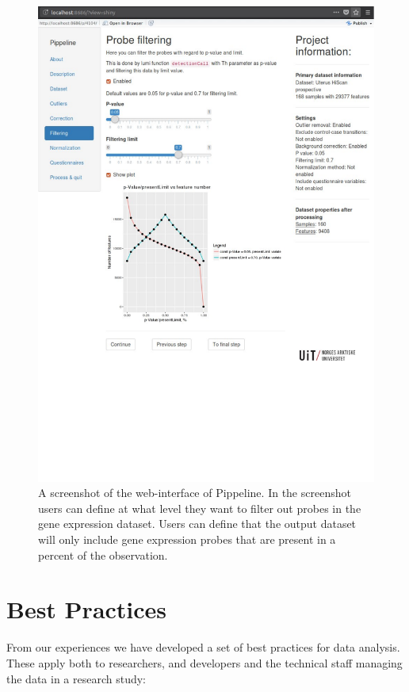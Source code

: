 \begin{figure}
    \includegraphics[width=\linewidth]{figures/scr_filtering.pdf}
    \caption[A screenshot of the web-interface of Pippeline.]{A screenshot of
    the web-interface of Pippeline. In the screenshot users can define at what
    level they want to filter out probes in the gene expression dataset. Users
    can define that the output dataset will only include gene expression probes
    that are present in a percent of the observation.}
  \label{fig:scr_filtering}
\end{figure}

\section{Best Practices} 
From our experiences we have developed a set of best practices for data
analysis. These apply both to researchers, and developers and the technical
staff managing the data in a research study: 

